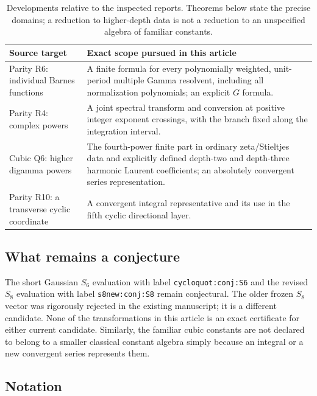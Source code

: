 \documentclass[11pt]{article}
\numberwithin{equation}{section}
\theoremstyle{plain}
\theoremstyle{definition}
\theoremstyle{remark}
\newcommand{\src}[1]{\nolinkurl{#1}}
\begin{document}
\begin{table}[htbp]
\small
\begin{tabularx}{\textwidth}{@{}>{\raggedright\arraybackslash}p{}Y@{}}
\toprule
Source target & Exact scope pursued in this article\\
\midrule
Parity R6: individual Barnes functions & A finite formula for every
polynomially weighted, unit-period multiple Gamma resolvent, including
all normalization polynomials; an explicit $G$ formula.\\[5pt]
Parity R4: complex powers & A joint spectral transform and conversion
at positive integer exponent crossings, with the branch fixed along
the integration interval.\\[5pt]
Cubic Q6: higher digamma powers & The fourth-power finite part in
ordinary zeta/Stieltjes data and explicitly defined depth-two and
depth-three harmonic Laurent coefficients; an absolutely convergent
series representation.\\[5pt]
Parity R10: a transverse cyclic coordinate & A convergent integral
representative and its use in the fifth cyclic directional layer.\\
\bottomrule
\end{tabularx}
\caption{Developments relative to the inspected reports. Theorems below
state the precise domains; a reduction to higher-depth data is not a
reduction to an unspecified algebra of familiar constants.}
\label{bhr:tab:targets}
\end{table}

\subsection{What remains a conjecture}

The short Gaussian $S_6$ evaluation with label
\src{cycloquot:conj:S6} and the revised $S_8$ evaluation with label
\src{s8new:conj:S8} remain conjectural. The older frozen $S_8$ vector
was rigorously rejected in the existing manuscript; it is a different
candidate. None of the transformations in this article is an exact
certificate for either current candidate. Similarly, the familiar
cubic constants are not declared to belong to a smaller classical
constant algebra simply because an integral or a new convergent
series represents them.

\subsection{Notation}
\end{document}
